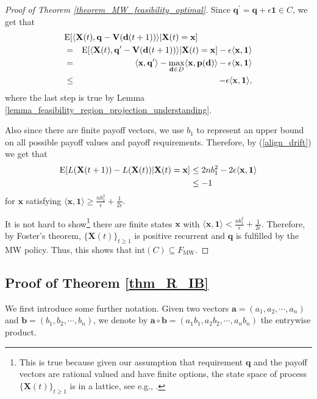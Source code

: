 \documentclass[prodmode,acmtompecs]{acmsmall}
\newcommand{\reqvec}{\mathbf{q}}
\newcommand{\feasibilityRegion}{F}
\begin{document}
\begin{proof}[Proof of Theorem \ref{theorem_MW_feasibility_optimal}]
Since $\reqvec^\prime =  \reqvec + \epsilon \mathbf{1} \in C$, we get that 
\begin{eqnarray*}
\lefteqn{\expectation[\langle \mathbf{X}(t), \reqvec - \mathbf{V}(\mathbf{d}(t+1)) \rangle | \mathbf{X}(t) = \mathbf{x}]}	\\
& = & \expectation[\langle \mathbf{X}(t), \reqvec^\prime - \mathbf{V}(\mathbf{d}(t+1)) \rangle | \mathbf{X}(t) = \mathbf{x}] - \epsilon \langle \mathbf{x}, \mathbf{1}\rangle	\\
& = & \langle \mathbf{x}, \reqvec^\prime \rangle - \max\limits_{\mathbf{d} \in D} \langle \mathbf{x}, \mathbf{p}(\mathbf{d})\rangle - \epsilon\langle \mathbf{x}, \mathbf{1}\rangle	\\
& \leq & - \epsilon\langle \mathbf{x}, \mathbf{1}\rangle, 
\end{eqnarray*}
where the last step is true by Lemma \ref{lemma_feasibility_region_projection_understanding}. 

Also since there are finite payoff vectors, we use $b_1$ to represent an upper bound on all possible payoff values and payoff requirements. 
Therefore, by (\ref{align_drift}) we get that
\begin{align*}
\operatorname*{\mathrm{E}}[L(\mathbf{X}(t+1)) - L(\mathbf{X}(t)) | \mathbf{X}(t) = \mathbf{x}] & \leq 2nb_1^2 - 2 \epsilon \langle \mathbf{x}, \mathbf{1} \rangle \\
& \leq -1
\end{align*}
for $\mathbf{x}$ satisfying $\langle\mathbf{x}, \mathbf{1}\rangle \geq \frac{nb_1^2}{\epsilon} + \frac{1}{2\epsilon}$. 

It is not hard to show\footnote{This is true because given our assumption that requirement $\reqvec$ and the payoff vectors are rational valued and have finite options, the state space of process $\{\mathbf{X}(t)\}_{t\geq 1}$ is in a lattice, see e.g., \cite{CoS13b}.} there are finite states $\mathbf{x}$ with $\langle\mathbf{x}, \mathbf{1}\rangle < \frac{nb_1^2}{\epsilon} + \frac{1}{2\epsilon}$. Therefore, by Foster's theorem, $\{\mathbf{X}(t)\}_{t\geq 1}$ is positive recurrent and $\reqvec$ is fulfilled by the MW policy. 
Thus, this shows that $\text{int}(C) \subseteq \feasibilityRegion_\text{MW}$. 
\end{proof}

\subsection{Proof of Theorem \ref{thm_R_IB}}
\label{appendix_pf_thm_R_IB_chap2}
We first introduce some further notation. Given two vectors $\boldsymbol{a}=(a_1, a_2, \cdots, a_n)$ and $\mathbf{b} = (b_1, b_2, \cdots, b_n)$, we denote by $\boldsymbol{a} \circ \mathbf{b}=(a_1 b_1, a_2 b_2, \cdots, a_n b_n)$ the entrywise product. 
\end{document}
